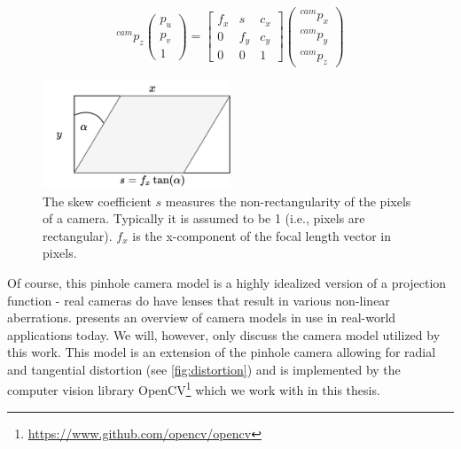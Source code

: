 \documentclass[headsepline, hidelinks, footsepline, footinclude=false, oneside, fontsize=11pt, paper=a4, listof=totoc, bibliography=totoc]{scrbook}
\begin{document}
\begin{equation}
\label{eq:pinhole-cam-skew}
{}^{cam}p_z\begin{pmatrix}p_u \\ p_v \\ 1 \end{pmatrix} = \begin{bmatrix}f_x & s & c_x \\ 0 & f_y & c_y \\ 0 & 0 & 1 \end{bmatrix}\begin{pmatrix}{}^{cam}p_x \\ {}^{cam}p_y \\ {}^{cam}p_z \end{pmatrix}
\end{equation}

\begin{figure}[htbp]
\centering
\includegraphics[width=0.5\textwidth]{figures/skew.pdf}
\caption{\label{fig:skew-coeff}The skew coefficient \(s\) measures the non-rectangularity of the pixels of a camera. Typically it is assumed to be 1 (i.e., pixels are rectangular). \(f_x\) is the x-component of the focal length vector in pixels.}
\end{figure}

Of course, this pinhole camera model is a highly idealized version of a projection function - real cameras do have lenses that result in various non-linear aberrations.
\cite{usenkoDoubleSphereCamera2018} presents an overview of camera models in use in real-world applications today. We will, however, only discuss the camera model utilized by this work.
This model is an extension of the pinhole camera allowing for radial and tangential distortion (see \cref{fig:distortion}) 
and is implemented by the computer vision library OpenCV\footnote{\url{https://www.github.com/opencv/opencv}} which we work with in this thesis.
\end{document}
